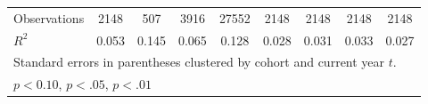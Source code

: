\begin{table}[htbp]
\begin{adjustbox}{max width=1\textwidth}
\begin{tabular}{l*{8}{c}}
\hline
Observations       &        2148         &         507         &        3916         &       27552         &        2148         &        2148         &        2148         &        2148         \\
\(R^{2}\)   &       0.053         &       0.145         &       0.065         &       0.128         &       0.028         &       0.031         &       0.033         &       0.027         \\
\hline \hline
\multicolumn{9}{l}{\footnotesize Standard errors in parentheses clustered by cohort and current year $t$.}\\
\multicolumn{9}{l}{\footnotesize \sym{*} \(p<0.10\), \sym{**} \(p<.05\), \sym{***} \(p<.01\)}\\
\end{tabular}%
	\end{adjustbox}
\end{table}